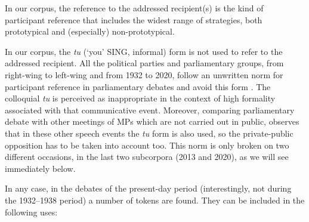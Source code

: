 \documentclass[output=paper]{langscibook}
\begin{document}
In our corpus, the reference to the addressed recipient(s) is the kind of participant reference that includes the widest range of strategies, both prototypical and (especially) non-prototypical.



\label{sec:nogue:2.2.1.1}





In our corpus, the \textit{tu} (`you' SING, informal) form is not used to refer to the addressed recipient. All the political parties and parliamentary groups, from right-wing to left-wing and from 1932 to 2020, follow an unwritten norm for participant reference in parliamentary debates and avoid this form \citep{Payà2022}. The colloquial \textit{tu} is perceived as inappropriate in the context of high formality associated with that communicative event. Moreover, comparing parliamentary debate with other meetings of MPs which are not carried out in public, \citet{Payà2022} observes that in these other speech events the \textit{tu} form is also used, so the private-public opposition has to be taken into account too. This norm is only broken on two different occasions, in the last two subcorpora (2013 and 2020), as we will see immediately below.



In any case, in the debates of the present-day period (interestingly, not during the 1932–1938 period) a number of  tokens are found. They can be included in the following uses:
\end{document}

